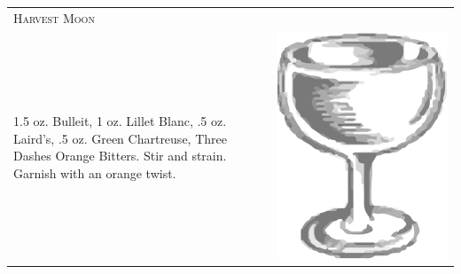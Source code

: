 \documentclass{article}
\begin{document}
\begin{tabular}{p{2in} p{0.5in}}
  \multicolumn{2}{p{3in}}{\centering\Huge\textsc{Harvest Moon}} \\ 
  
   \vspace{-0.1in}1.5 oz. Bulleit, 1 oz. Lillet Blanc, .5 oz. Laird's, .5 oz.
    Green Chartreuse, Three Dashes Orange Bitters. Stir and
    strain. Garnish with an orange twist.  &
   \vspace{-0.1in} \includegraphics{coupe.png}
\end{tabular}
\end{document}
